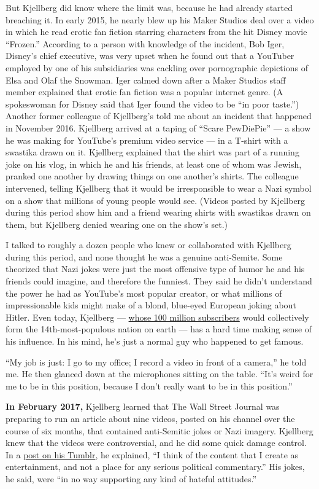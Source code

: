 But Kjellberg did know where the limit was, because he had already
started breaching it. In early 2015, he nearly blew up his Maker Studios
deal over a video in which he read erotic fan fiction starring
characters from the hit Disney movie ``Frozen.'' According to a person
with knowledge of the incident, Bob Iger, Disney's chief executive, was
very upset when he found out that a YouTuber employed by one of his
subsidiaries was cackling over pornographic depictions of Elsa and Olaf
the Snowman. Iger calmed down after a Maker Studios staff member
explained that erotic fan fiction was a popular internet genre. (A
spokeswoman for Disney said that Iger found the video to be ``in poor
taste.'') Another former colleague of Kjellberg's told me about an
incident that happened in November 2016. Kjellberg arrived at a taping
of ``Scare PewDiePie'' --- a show he was making for YouTube's premium
video service --- in a T-shirt with a swastika drawn on it. Kjellberg
explained that the shirt was part of a running joke on his vlog, in
which he and his friends, at least one of whom was Jewish, pranked one
another by drawing things on one another's shirts. The colleague
intervened, telling Kjellberg that it would be irresponsible to wear a
Nazi symbol on a show that millions of young people would see. (Videos
posted by Kjellberg during this period show him and a friend wearing
shirts with swastikas drawn on them, but Kjellberg denied wearing one on
the show's set.)

I talked to roughly a dozen people who knew or collaborated with
Kjellberg during this period, and none thought he was a genuine
anti-Semite. Some theorized that Nazi jokes were just the most offensive
type of humor he and his friends could imagine, and therefore the
funniest. They said he didn't understand the power he had as YouTube's
most popular creator, or what millions of impressionable kids might make
of a blond, blue-eyed European joking about Hitler. Even today,
Kjellberg --- \href{https://www.youtube.com/watch?v=DYlesHOaPkY}{whose
100 million subscribers} would collectively form the 14th-most-populous
nation on earth --- has a hard time making sense of his influence. In
his mind, he's just a normal guy who happened to get famous.

``My job is just: I go to my office; I record a video in front of a
camera,'' he told me. He then glanced down at the microphones sitting on
the table. ``It's weird for me to be in this position, because I don't
really want to be in this position.''

\textbf{In February 2017,} Kjellberg learned that The Wall Street
Journal was preparing to run an article about nine videos, posted on his
channel over the course of six months, that contained anti-Semitic jokes
or Nazi imagery. Kjellberg knew that the videos were controversial, and
he did some quick damage control. In a
\href{https://pewdie.tumblr.com/post/157160889655/just-to-clear-some-things-up}{post
on his Tumblr}, he explained, ``I think of the content that I create as
entertainment, and not a place for any serious political commentary.''
His jokes, he said, were ``in no way supporting any kind of hateful
attitudes.''

